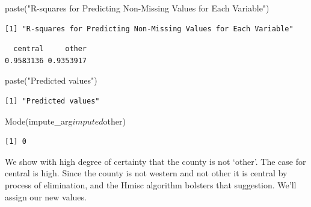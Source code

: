 \documentclass[]{article}
\newenvironment{Shaded}{}{}
\newcommand{\KeywordTok}[1]{\textcolor[rgb]{0.00,0.00,1.00}{#1}}
\newcommand{\NormalTok}[1]{#1}
\newcommand{\OperatorTok}[1]{#1}
\newcommand{\StringTok}[1]{\textcolor[rgb]{0.00,0.50,0.50}{#1}}
\begin{document}
\begin{Shaded}
\begin{Highlighting}[]
\KeywordTok{paste}\NormalTok{(}\StringTok{"R-squares for Predicting Non-Missing Values for Each Variable"}\NormalTok{)}
\end{Highlighting}
\end{Shaded}

\begin{verbatim}
[1] "R-squares for Predicting Non-Missing Values for Each Variable"
\end{verbatim}

\begin{Shaded}
\end{Shaded}

\begin{verbatim}
  central     other 
0.9583136 0.9353917 
\end{verbatim}

\begin{Shaded}
\begin{Highlighting}[]
\KeywordTok{paste}\NormalTok{(}\StringTok{"Predicted values"}\NormalTok{)}
\end{Highlighting}
\end{Shaded}

\begin{verbatim}
[1] "Predicted values"
\end{verbatim}

\begin{Shaded}
\begin{Highlighting}[]
\KeywordTok{Mode}\NormalTok{(impute_arg}\OperatorTok{$}\NormalTok{imputed}\OperatorTok{$}\NormalTok{other)}
\end{Highlighting}
\end{Shaded}

\begin{verbatim}
[1] 0
\end{verbatim}

We show with high degree of certainty that the county is not `other'.
The case for central is high. Since the county is not western and not
other it is central by process of elimination, and the Hmisc algorithm
bolsters that suggestion. We'll assign our new values.
\end{document}
